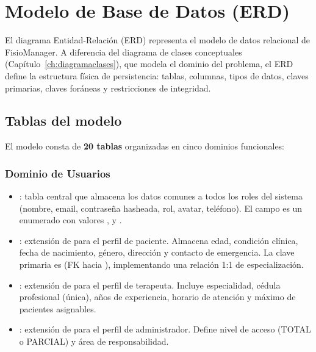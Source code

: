 
\chapter{Modelo de Base de Datos (ERD)}\label{ch:modeloerd}

El diagrama Entidad-Relación (ERD) representa el modelo de datos relacional de FisioManager. A diferencia del diagrama de clases conceptuales (Capítulo~\ref{ch:diagramaclases}), que modela el dominio del problema, el ERD define la estructura física de persistencia: tablas, columnas, tipos de datos, claves primarias, claves foráneas y restricciones de integridad.

\section{Tablas del modelo}

El modelo consta de \textbf{20 tablas} organizadas en cinco dominios funcionales:

\subsection{Dominio de Usuarios}

\begin{itemize}
  \item {}: tabla central que almacena los datos comunes a todos los roles del sistema (nombre, email, contraseña hasheada, rol, avatar, teléfono). El campo  es un enumerado con valores ,  y .

  \item {}: extensión de  para el perfil de paciente. Almacena edad, condición clínica, fecha de nacimiento, género, dirección y contacto de emergencia. La clave primaria es  (FK hacia ), implementando una relación 1:1 de especialización.

  \item {}: extensión de  para el perfil de terapeuta. Incluye especialidad, cédula profesional (única), años de experiencia, horario de atención y máximo de pacientes asignables.

  \item {}: extensión de  para el perfil de administrador. Define nivel de acceso (TOTAL o PARCIAL) y área de responsabilidad.
\end{itemize}

